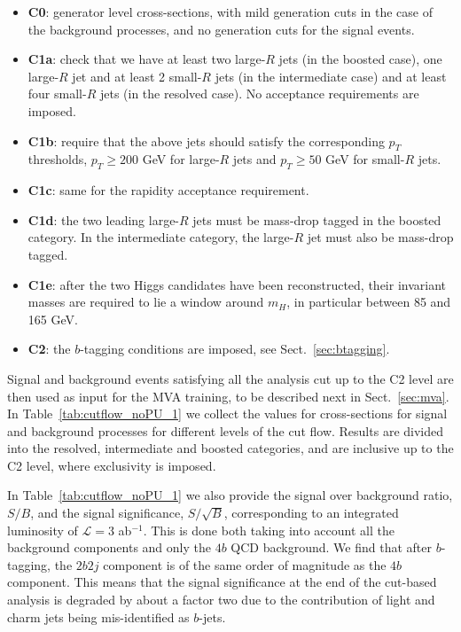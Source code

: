     \begin{itemize}
    \item {\bf C0}:  generator level cross-sections, with
      mild generation cuts in the case of the background processes, and no
      generation cuts
      for the signal events.
    \item {\bf C1a}:  check that we have at least
      two large-$R$ jets (in the boosted case),
      one large-$R$ jet and at least 2 small-$R$ jets (in the intermediate
      case) and at least four small-$R$ jets (in the resolved case).
      No acceptance requirements are imposed.
    \item {\bf C1b}: require that the above jets should
      satisfy the corresponding $p_T$ thresholds,
      $p_T \ge 200$ GeV for large-$R$ jets and
      $p_T \ge 50$ GeV for small-$R$ jets.
    \item {\bf C1c}: same for the
      rapidity acceptance requirement.
    \item {\bf C1d}: the two leading large-$R$ jets must
      be mass-drop tagged in the boosted category.
      In the intermediate category, the large-$R$ jet must also be mass-drop tagged.
    \item {\bf C1e}: after the two Higgs candidates  have been reconstructed,
      their invariant masses are required to lie a window around $m_H$,
      in particular between 85 and 165 GeV.
          \item {\bf C2}: the
            $b$-tagging conditions are
            imposed, see
            Sect.~\ref{sec:btagging}.
      \end{itemize}
    Signal and background events satisfying all the analysis cut up to the
    C2 level
    are then used as input for the MVA training, to be described next
    in Sect.~\ref{sec:mva}.
    In Table~\ref{tab:cutflow_noPU_1} we collect
    the values for cross-sections for signal and background processes
    for different levels of the cut flow.
    Results are divided into the resolved, intermediate and boosted categories,
    and are inclusive up to the C2 level, where exclusivity is imposed.

In Table~\ref{tab:cutflow_noPU_1} we also  provide the signal over
      background ratio, $S/B$, and the signal
      significance, $S/\sqrt{B}$, corresponding to an integrated
      luminosity of $\mathcal{L}=3$ ab$^{-1}$.
      This is done both taking into account all the background components and only
      the $4b$ QCD background.
      We find that after $b$-tagging, the  $2b2j$ component is
      of the same order of magnitude as the $4b$ component.
      This means that the signal significance at the end of the cut-based
      analysis is degraded by about a factor two due to the contribution
      of light and charm jets being mis-identified as $b$-jets.
    

